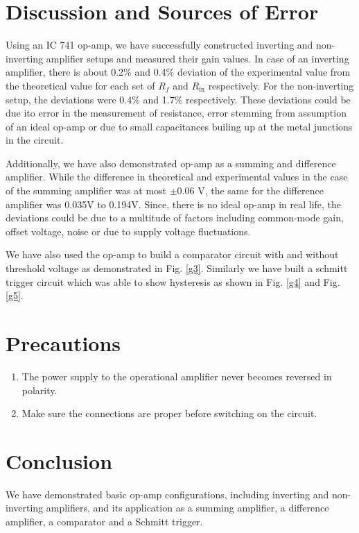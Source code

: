 \section{Discussion and Sources of Error}
Using an IC 741 op-amp, we have successfully constructed inverting and non-inverting amplifier setups and measured their gain values. In case of an inverting amplifier, there is about 0.2\% and 0.4\% deviation of the experimental value from the theoretical value for each set of $R_f$ and $R_\text{in}$ respectively. For the non-inverting setup, the deviations were 0.4\% and 1.7\% respectively. These deviations could be due ito error in the measurement of resistance, error stemming from assumption of an ideal op-amp or due to small capacitances builing up at the metal junctions in the circuit.

Additionally, we have also demonstrated op-amp as a summing and difference amplifier. While the difference in theoretical and experimental values in the case of the summing amplifier was at most $\pm$0.06 V, the same for the difference amplifier was 0.035V to 0.194V. Since, there is no ideal op-amp in real life, the deviations could be due to a multitude of factors including common-mode gain, offset voltage, noise or due to supply voltage fluctuations. 

We have also used the op-amp to build a comparator circuit with and without threshold voltage as demonstrated in Fig. \ref{g3}. Similarly we have built a schmitt trigger circuit which was able to show hysteresis as shown in Fig. \ref{g4} and Fig. \ref{g5}. 

\section{Precautions}

\begin{enumerate}
    \item The power supply to the operational amplifier never becomes reversed in polarity.
    \item Make sure the connections are proper before switching on the circuit.
\end{enumerate}

\section{Conclusion}
We have demonstrated basic op-amp configurations, including inverting and non-inverting amplifiers, and its application as a summing amplifier, a difference amplifier, a comparator and a Schmitt trigger.

